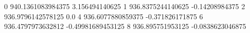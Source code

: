 0 940.1361083984375 3.156494140625
1 936.8375244140625 -0.14208984375
2 936.9796142578125 0.0
4 936.6077880859375 -0.371826171875
6 936.4797973632812 -0.49981689453125
8 936.895751953125 -0.0838623046875
